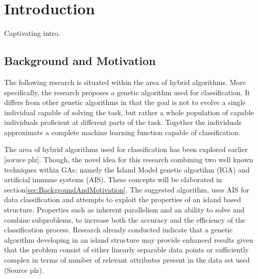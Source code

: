 \chapter{Introduction}
\label{cha:Introduction}
Captivating intro.


\section{Background and Motivation}\label{cit}
\label{sec:BackgroundAndMotivation}
The following research is situated within the area of hybrid algorithms.
More specifically, the research proposes a genetic algorithm used for classification. It differs from other genetic algorithms in that the goal is not to evolve a single individual capable of solving the task, but rather a whole population of capable individuals proficient at different parts of the task. Together the individuals approximate a complete machine learning function capable of classification. 


The area of hybrid algorithms used for classification has been explored earlier [soruce plz]. Though, the novel idea for this research combining two well known techniques within GAs; namely the Island Model genetic algortihm (IGA) and artificial immune systems (AIS). These concepts will be elaborated in section\ref{sec:BackgroundAndMotivation}. %
The suggested algorithm, uses AIS for data classification and attempts to exploit the properties of an island based structure. Properties such as inherent parallelism and an ability to solve and combine subproblems, to increase both the accuracy and the efficiency of the classification process. Research already conducted indicate that a genetic algorithm developing in an island structure may provide enhanced results given that the problem consist of either linearly separable data points or sufficiently complex in terms of number of relevant attributes present in the data set used (Source plz). 

